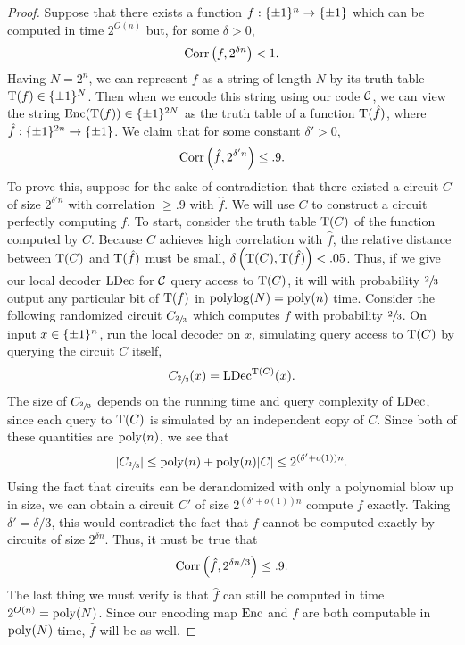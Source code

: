 \documentclass[11pt]{article}
\begin{document}
\begin{proof}
    Suppose that there exists a function $f : \{\pm 1\}^n \rightarrow \{\pm 1\}$ which can be computed in time $2^{O(n)}$ but, for some $\delta > 0$, 
    \begin{equation*}
        \mathrm{Corr}\left(f, 2^{\delta n}\right) < 1.
    \end{equation*}
    Having $N = 2^n$, we can represent $f$ as a string of length $N$ by its truth table $\mathrm{T}(f) \in \{\pm 1\}^N$. Then when we encode this string using our code $\mathcal{C}$, we can view the string $\mathrm{Enc}(\mathrm{T}(f)) \in \{\pm 1\}^{2N}$ as the truth table of a function $\mathrm{T}(\hat{f})$, where $\hat{f} : \{\pm 1\}^{2n} \rightarrow \{\pm 1\}$. We claim that for some constant $\delta' > 0$,
    \begin{equation*}
        \mathrm{Corr}\left(\hat{f}, 2^{\delta' n}\right) \leq .9.
    \end{equation*}
    To prove this, suppose for the sake of contradiction that there existed a circuit $C$ of size $2^{\delta' n}$ with correlation $\geq .9$ with $\hat{f}$. We will use $C$ to construct a circuit perfectly computing $f$. To start, consider the truth table $\mathrm{T}(C)$ of the function computed by $C$. Because $C$ achieves high correlation with $\hat{f}$, the relative distance between $\mathrm{T}(C)$ and $\mathrm{T}(\hat{f})$ must be small, $\delta\left(\mathrm{T}(C), \mathrm{T}(\hat{f})\right) < .05$. Thus, if we give our local decoder ${\textup{LDec}}$ for $\mathcal{C}$ query access to $\mathrm{T}(C)$, it will with probability $\sfrac{2}{3}$ output any particular bit of $\mathrm{T}(f)$ in $\mathrm{polylog}(N) = \mathrm{poly}(n)$ time. Consider the following randomized circuit $C_{\sfrac{2}{3}}$ which computes $f$ with probability $\sfrac{2}{3}$. On input $x \in \{\pm 1\}^n$, run the local decoder on $x$, simulating query access to $\mathrm{T}(C)$ by querying the circuit $C$ itself,
    \begin{equation*}
        C_{\sfrac{2}{3}}(x) = {\textup{LDec}}^{\mathrm{T}(C)}(x).
    \end{equation*}
    The size of $C_{\sfrac{2}{3}}$ depends on the running time and query complexity of ${\textup{LDec}}$, since each query to $\mathrm{T}(C)$ is simulated by an independent copy of $C$. Since both of these quantities are $\mathrm{poly}(n)$, we see that 
    \begin{equation*}
        |C_{\sfrac{2}{3}}|  \leq \mathrm{poly}(n) + \mathrm{poly}(n) |C| \leq 2^{(\delta' + o(1))n}.
    \end{equation*}
    Using the fact that circuits can be derandomized with only a polynomial blow up in size, we can obtain a circuit $C'$ of size $2^{(\delta' + o(1))n}$ compute $f$ exactly. Taking $\delta' = \delta / 3$, this would contradict the fact that $f$ cannot be computed exactly by circuits of size $2^{\delta n}$. Thus, it must be true that 
    \begin{equation*}
        \mathrm{Corr}\left(\hat{f}, 2^{\delta n / 3}\right) \leq .9.
    \end{equation*}
    The last thing we must verify is that $\hat{f}$ can still be computed in time $2^{O(n)} = \mathrm{poly}(N)$. Since our encoding map $\mathrm{Enc}$ and $f$ are both computable in $\mathrm{poly}(N)$ time, $\hat{f}$ will be as well.
\end{proof}
\end{document}
